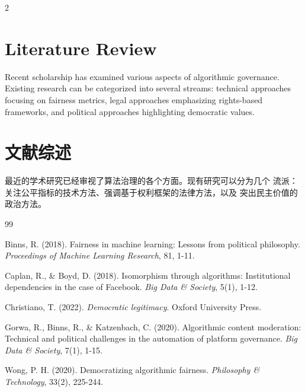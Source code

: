 \documentclass[12pt,a4paper]{article}
\begin{document}
\newpage

\begin{paracol}{2}

\section*{Literature Review}

Recent scholarship has examined various aspects of algorithmic governance.
Existing research can be categorized into several streams: technical approaches 
focusing on fairness metrics, legal approaches emphasizing rights-based 
frameworks, and political approaches highlighting democratic values.

\switchcolumn

\section*{文献综述}

最近的学术研究已经审视了算法治理的各个方面。现有研究可以分为几个
流派：关注公平指标的技术方法、强调基于权利框架的法律方法，以及
突出民主价值的政治方法。

\end{paracol}

\newpage
\begin{thebibliography}{99}

Binns, R. (2018). Fairness in machine learning: Lessons from political 
philosophy. \textit{Proceedings of Machine Learning Research}, 81, 1-11.

Caplan, R., \& Boyd, D. (2018). Isomorphism through algorithms: Institutional 
dependencies in the case of Facebook. \textit{Big Data \& Society}, 5(1), 1-12.

Christiano, T. (2022). \textit{Democratic legitimacy}. Oxford University Press.

Gorwa, R., Binns, R., \& Katzenbach, C. (2020). Algorithmic content 
moderation: Technical and political challenges in the automation of platform 
governance. \textit{Big Data \& Society}, 7(1), 1-15.

Wong, P. H. (2020). Democratizing algorithmic fairness. 
\textit{Philosophy \& Technology}, 33(2), 225-244.

\end{thebibliography}
\end{document}
